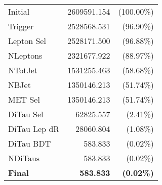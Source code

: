\begin{tabular}{lrr}
\toprule
Initial        & 2609591.154       & (100.00\%)         \\
Trigger        & 2528568.531       & (96.90\%)          \\
Lepton Sel     & 2528171.500       & (96.88\%)          \\
NLeptons       & 2321677.922       & (88.97\%)          \\
NTotJet        & 1531255.463       & (58.68\%)          \\
NBJet          & 1350146.213       & (51.74\%)          \\
MET Sel        & 1350146.213       & (51.74\%)          \\
DiTau Sel      & 62825.557         & (2.41\%)           \\
DiTau Lep dR   & 28060.804         & (1.08\%)           \\
DiTau BDT      & 583.833           & (0.02\%)           \\
NDiTaus        & 583.833           & (0.02\%)           \\
\textbf{Final} & \textbf{583.833}  & \textbf{(0.02\%)}  \\
\bottomrule
\end{tabular}